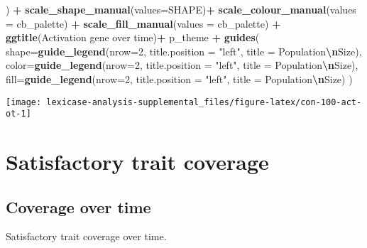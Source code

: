 \documentclass[
]{book}
\newenvironment{Shaded}{\begin{snugshade}}{\end{snugshade}}
\newcommand{\AttributeTok}[1]{\textcolor[rgb]{0.13,0.29,0.53}{#1}}
\newcommand{\DecValTok}[1]{\textcolor[rgb]{0.00,0.00,0.81}{#1}}
\newcommand{\FunctionTok}[1]{\textcolor[rgb]{0.13,0.29,0.53}{\textbf{#1}}}
\newcommand{\NormalTok}[1]{#1}
\newcommand{\SpecialCharTok}[1]{\textcolor[rgb]{0.81,0.36,0.00}{\textbf{#1}}}
\newcommand{\StringTok}[1]{\textcolor[rgb]{0.31,0.60,0.02}{#1}}
\begin{document}
\begin{Shaded}
\begin{Highlighting}[]
\NormalTok{  ) }\SpecialCharTok{+}
  \FunctionTok{scale\_shape\_manual}\NormalTok{(}\AttributeTok{values=}\NormalTok{SHAPE)}\SpecialCharTok{+}
  \FunctionTok{scale\_colour\_manual}\NormalTok{(}\AttributeTok{values =}\NormalTok{ cb\_palette) }\SpecialCharTok{+}
  \FunctionTok{scale\_fill\_manual}\NormalTok{(}\AttributeTok{values =}\NormalTok{ cb\_palette) }\SpecialCharTok{+}
  \FunctionTok{ggtitle}\NormalTok{(}\StringTok{\textquotesingle{}Activation gene over time\textquotesingle{}}\NormalTok{)}\SpecialCharTok{+}
\NormalTok{  p\_theme }\SpecialCharTok{+}
  \FunctionTok{guides}\NormalTok{(}
    \AttributeTok{shape=}\FunctionTok{guide\_legend}\NormalTok{(}\AttributeTok{nrow=}\DecValTok{2}\NormalTok{, }\AttributeTok{title.position =} \StringTok{"left"}\NormalTok{, }\AttributeTok{title =} \StringTok{\textquotesingle{}Population}\SpecialCharTok{\textbackslash{}n}\StringTok{Size\textquotesingle{}}\NormalTok{),}
    \AttributeTok{color=}\FunctionTok{guide\_legend}\NormalTok{(}\AttributeTok{nrow=}\DecValTok{2}\NormalTok{, }\AttributeTok{title.position =} \StringTok{"left"}\NormalTok{, }\AttributeTok{title =} \StringTok{\textquotesingle{}Population}\SpecialCharTok{\textbackslash{}n}\StringTok{Size\textquotesingle{}}\NormalTok{),}
    \AttributeTok{fill=}\FunctionTok{guide\_legend}\NormalTok{(}\AttributeTok{nrow=}\DecValTok{2}\NormalTok{, }\AttributeTok{title.position =} \StringTok{"left"}\NormalTok{, }\AttributeTok{title =} \StringTok{\textquotesingle{}Population}\SpecialCharTok{\textbackslash{}n}\StringTok{Size\textquotesingle{}}\NormalTok{)}
\NormalTok{  )}
\end{Highlighting}
\end{Shaded}

\texttt{[image: lexicase-analysis-supplemental\_files/figure-latex/con-100-act-ot-1]}

\hypertarget{satisfactory-trait-coverage-1}{%
\section{Satisfactory trait coverage}\label{satisfactory-trait-coverage-1}}

\hypertarget{coverage-over-time-3}{%
\subsection{Coverage over time}\label{coverage-over-time-3}}

Satisfactory trait coverage over time.
\end{document}

